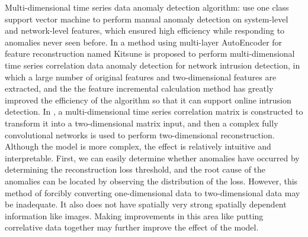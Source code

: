 \begin{survey}
Multi-dimensional time series data anomaly detection algorithm: \cite{DBLP:journals/tdsc/WatsonSMMH16} use one class support vector machine to perform manual anomaly detection on system-level and network-level features, which ensured high efficiency while responding to anomalies never seen before. In \cite{DBLP:conf/ndss/MirskyDES18} a method using multi-layer AutoEncoder for feature reconstruction named Kitsune is proposed to perform multi-dimensional time series correlation data anomaly detection for network intrusion detection, in which a large number of original features and two-dimensional features are extracted, and the the feature incremental calculation method has greatly improved the efficiency of the algorithm so that it can support online intrusion detection. In \cite{DBLP:conf/aaai/ZhangSCFLCNZCC19}, a multi-dimensional time series correlation matrix is constructed to transform it into a two-dimensional matrix input, and then a complex fully convolutional networks is used to perform two-dimensional reconstruction. Although the model is more complex, the effect is relatively intuitive and interpretable. First, we can easily determine whether anomalies have occurred by determining the reconstruction loss threshold, and the root cause of the anomalies can be located by observing the distribution of the loss. However, this method of forcibly converting one-dimensional data to two-dimensional data may be inadequate. It also does not have spatially very strong spatially dependent information like images. Making improvements in this area like putting correlative data together may further improve the effect of the model.


\end{survey}

